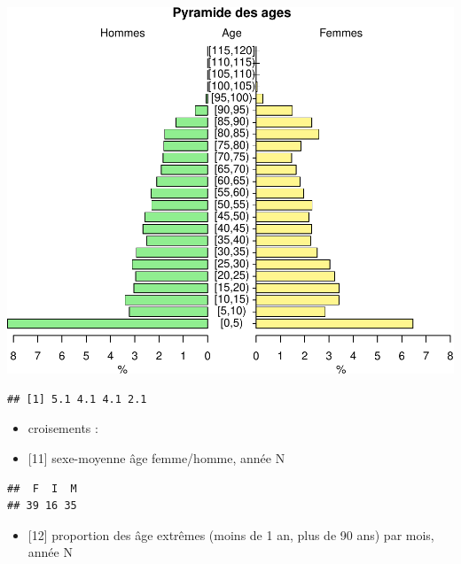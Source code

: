\documentclass[]{article}
\begin{document}
\includegraphics{rapport_2014_files/figure-latex/pyramide-1.pdf}

\begin{verbatim}
## [1] 5.1 4.1 4.1 2.1
\end{verbatim}

\begin{itemize}
\item
  croisements :
\item
  {[}11{]} sexe-moyenne âge femme/homme, année N
\end{itemize}

\begin{verbatim}
##  F  I  M 
## 39 16 35
\end{verbatim}

\begin{itemize}
\itemsep1pt\parskip0pt
\item
  {[}12{]} proportion des âge extrêmes (moins de 1 an, plus de 90 ans)
  par mois, année N
\end{itemize}
\end{document}
